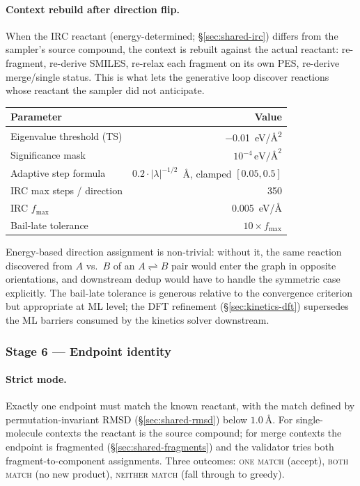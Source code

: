 \paragraph{Context rebuild after direction flip.}
When the IRC reactant (energy-determined; \S\ref{sec:shared-irc}) differs from the sampler's source compound, the context is rebuilt against the actual reactant: re-fragment, re-derive SMILES, re-relax each fragment on its own PES, re-derive merge/single status. This is what lets the generative loop discover reactions whose reactant the sampler did not anticipate.

\noindent\begin{tabular}{lr}
\toprule
Parameter & Value \\
\midrule
Eigenvalue threshold (TS) & \SI{-0.01}{eV/\angstrom^2} \\
Significance mask & $10^{-4}\,\text{eV/\AA}^2$ \\
Adaptive step formula & $0.2 \cdot |\lambda|^{-1/2}$~\AA, clamped $[0.05, 0.5]$ \\
IRC max steps / direction & 350 \\
IRC $f_\text{max}$ & \SI{0.005}{eV/\angstrom} \\
Bail-late tolerance & $10\times f_\text{max}$ \\
\bottomrule
\end{tabular}

Energy-based direction assignment is non-trivial: without it, the same reaction discovered from $A$ vs.\ $B$ of an $A \rightleftharpoons B$ pair would enter the graph in opposite orientations, and downstream dedup would have to handle the symmetric case explicitly. The bail-late tolerance is generous relative to the convergence criterion but appropriate at ML level; the DFT refinement (\S\ref{sec:kinetics-dft}) supersedes the ML barriers consumed by the kinetics solver downstream.


\subsubsection{Stage 6 --- Endpoint identity}
\label{sec:endpoints}

\paragraph{Strict mode.}
Exactly one endpoint must match the known reactant, with the match defined by permutation-invariant RMSD (\S\ref{sec:shared-rmsd}) below $\SI{1.0}{\angstrom}$. For single-molecule contexts the reactant is the source compound; for merge contexts the endpoint is fragmented (\S\ref{sec:shared-fragments}) and the validator tries both fragment-to-component assignments. Three outcomes: \textsc{one match} (accept), \textsc{both match} (no new product), \textsc{neither match} (fall through to greedy).

